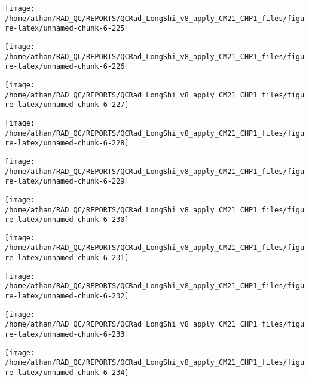 \documentclass[
  10pt,
  a4paper,oneside]{article}
\begin{document}
\begin{center}\texttt{[image: /home/athan/RAD\_QC/REPORTS/QCRad\_LongShi\_v8\_apply\_CM21\_CHP1\_files/figure-latex/unnamed-chunk-6-225]} \end{center}

\begin{center}\texttt{[image: /home/athan/RAD\_QC/REPORTS/QCRad\_LongShi\_v8\_apply\_CM21\_CHP1\_files/figure-latex/unnamed-chunk-6-226]} \end{center}

\begin{center}\texttt{[image: /home/athan/RAD\_QC/REPORTS/QCRad\_LongShi\_v8\_apply\_CM21\_CHP1\_files/figure-latex/unnamed-chunk-6-227]} \end{center}

\begin{center}\texttt{[image: /home/athan/RAD\_QC/REPORTS/QCRad\_LongShi\_v8\_apply\_CM21\_CHP1\_files/figure-latex/unnamed-chunk-6-228]} \end{center}

\begin{center}\texttt{[image: /home/athan/RAD\_QC/REPORTS/QCRad\_LongShi\_v8\_apply\_CM21\_CHP1\_files/figure-latex/unnamed-chunk-6-229]} \end{center}

\begin{center}\texttt{[image: /home/athan/RAD\_QC/REPORTS/QCRad\_LongShi\_v8\_apply\_CM21\_CHP1\_files/figure-latex/unnamed-chunk-6-230]} \end{center}

\begin{center}\texttt{[image: /home/athan/RAD\_QC/REPORTS/QCRad\_LongShi\_v8\_apply\_CM21\_CHP1\_files/figure-latex/unnamed-chunk-6-231]} \end{center}

\begin{center}\texttt{[image: /home/athan/RAD\_QC/REPORTS/QCRad\_LongShi\_v8\_apply\_CM21\_CHP1\_files/figure-latex/unnamed-chunk-6-232]} \end{center}

\begin{center}\texttt{[image: /home/athan/RAD\_QC/REPORTS/QCRad\_LongShi\_v8\_apply\_CM21\_CHP1\_files/figure-latex/unnamed-chunk-6-233]} \end{center}

\begin{center}\texttt{[image: /home/athan/RAD\_QC/REPORTS/QCRad\_LongShi\_v8\_apply\_CM21\_CHP1\_files/figure-latex/unnamed-chunk-6-234]} \end{center}
\end{document}
